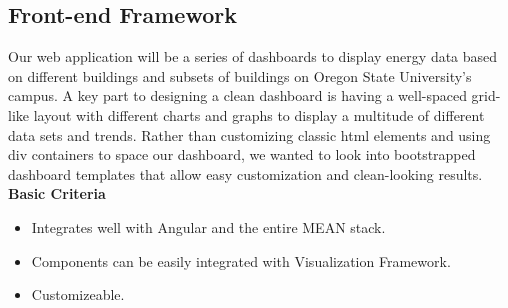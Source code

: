 \subsection{Front-end Framework}
Our web application will be a series of dashboards to display energy data based on different buildings and subsets of buildings on Oregon State University's campus. A key part to designing a clean dashboard is having a well-spaced grid-like layout with different charts and graphs to display a multitude of different data sets and trends. Rather than customizing classic html elements and using div containers to space our dashboard, we wanted to look into bootstrapped dashboard templates that allow easy customization and clean-looking results.\\ 
\textbf{Basic Criteria}
\begin{itemize}
\item Integrates well with Angular and the entire MEAN stack. 
\item Components can be easily integrated with Visualization Framework. 
\item Customizeable.
\end{itemize}
